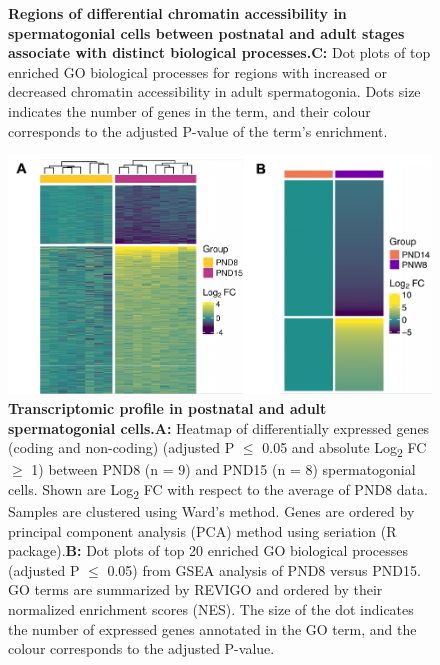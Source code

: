 \documentclass[12pt,twoside]{reedthesis}
\begin{document}
\begin{subfigures}
\begin{figure}[htbp]
{}

\caption[Regions of differential chromatin accessibility in spermatogonial cells between postnatal and adult stages]{\textbf{Regions of differential chromatin accessibility in spermatogonial cells between postnatal and adult stages associate with distinct biological processes.}\newline \textbf{C:} Dot plots of top enriched GO biological processes for regions with increased or decreased chromatin accessibility in adult spermatogonia. Dots size indicates the number of genes in the term, and their colour corresponds to the adjusted P-value of the term’s enrichment.}\label{fig:df1b}
\end{figure}
\end{subfigures}
\begin{subfigures}


\begin{figure}[htbp]

{\centering \includegraphics{thesis_files/figure-latex/df2a-1} 

}

\caption[Transcriptomic profile in postnatal and adult spermatogonial cells]{\textbf{Transcriptomic profile in postnatal and adult spermatogonial cells.}\newline \textbf{A:} Heatmap of differentially expressed genes (coding and non-coding) (adjusted P $\leq$ 0.05 and absolute Log\textsubscript{2} FC $\geq$ 1) between PND8 (n = 9) and PND15 (n = 8) spermatogonial cells. Shown are Log\textsubscript{2} FC with respect to the average of PND8 data. Samples are clustered using Ward’s method. Genes are ordered by principal component analysis (PCA) method using seriation (R package).\newline \textbf{B:} Dot plots of top 20 enriched GO biological processes  (adjusted P $\leq$ 0.05) from GSEA analysis of PND8 versus PND15. GO terms are summarized by REVIGO and ordered by their normalized enrichment scores (NES). The size of the dot indicates the number of expressed genes annotated in the GO term, and the colour corresponds to the adjusted P-value.}\label{fig:df2a}
\end{figure}


\end{subfigures}
\end{document}
